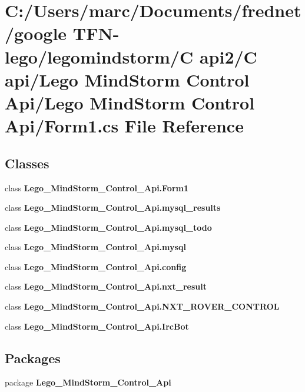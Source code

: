 \section{C:/Users/marc/Documents/frednet/google TFN-lego/legomindstorm/C api2/C api/Lego MindStorm Control Api/Lego MindStorm Control Api/Form1.cs File Reference}
\label{_form1_8cs}
\subsection*{Classes}
\begin{CompactItemize}
\item 
class {\bf Lego\_\-MindStorm\_\-Control\_\-Api.Form1}
\item 
class {\bf Lego\_\-MindStorm\_\-Control\_\-Api.mysql\_\-results}
\item 
class {\bf Lego\_\-MindStorm\_\-Control\_\-Api.mysql\_\-todo}
\item 
class {\bf Lego\_\-MindStorm\_\-Control\_\-Api.mysql}
\item 
class {\bf Lego\_\-MindStorm\_\-Control\_\-Api.config}
\item 
class {\bf Lego\_\-MindStorm\_\-Control\_\-Api.nxt\_\-result}
\item 
class {\bf Lego\_\-MindStorm\_\-Control\_\-Api.NXT\_\-ROVER\_\-CONTROL}
\item 
class {\bf Lego\_\-MindStorm\_\-Control\_\-Api.IrcBot}
\end{CompactItemize}
\subsection*{Packages}
\begin{CompactItemize}
\item 
package {\bf Lego\_\-MindStorm\_\-Control\_\-Api}
\end{CompactItemize}

